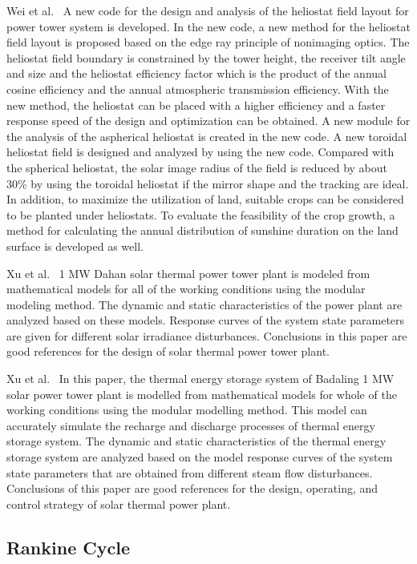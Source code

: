 Wei et al.~\cite{Wei2010a} A new code for the design and analysis of the heliostat field layout for power tower system is developed. In the new code, a new method for the heliostat field layout is proposed based on the edge ray principle of nonimaging optics. The heliostat field boundary is constrained by the tower height, the receiver tilt angle and size and the heliostat efficiency factor which is the product of the annual cosine efficiency and the annual atmospheric transmission efficiency. With the new method, the heliostat can be placed with a higher efficiency and a faster response speed of the design and optimization can be obtained. A new module for the analysis of the aspherical heliostat is created in the new code. A new toroidal heliostat field is designed and analyzed by using the new code. Compared with the spherical heliostat, the solar image radius of the field is reduced by about 30{\%} by using the toroidal heliostat if the mirror shape and the tracking are ideal. In addition, to maximize the utilization of land, suitable crops can be considered to be planted under heliostats. To evaluate the feasibility of the crop growth, a method for calculating the annual distribution of sunshine duration on the land surface is developed as well.

Xu et al.~\cite{Xu2011a} 1 MW Dahan solar thermal power tower plant is modeled from mathematical models for all of the working conditions using the modular modeling method. The dynamic and static characteristics of the power plant are analyzed based on these models. Response curves of the system state parameters are given for different solar irradiance disturbances. Conclusions in this paper are good references for the design of solar thermal power tower plant.

Xu et al.~\cite{Xu2012} In this paper, the thermal energy storage system of Badaling 1 MW solar power tower plant is modelled from mathematical models for whole of the working conditions using the modular modelling method. This model can accurately simulate the recharge and discharge processes of thermal energy storage system. The dynamic and static characteristics of the thermal energy storage system are analyzed based on the model response curves of the system state parameters that are obtained from different steam flow disturbances. Conclusions of this paper are good references for the design, operating, and control strategy of solar thermal power plant.

\subsection{Rankine Cycle}\label{sec:rc}



